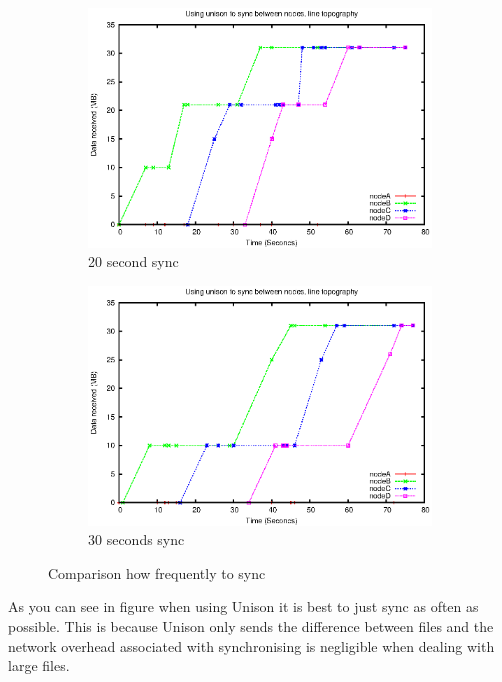 \documentclass[12pt]{article}
\begin{document}
\begin{figure}[htp]
    \begin{subfigure}[b]{0.5\linewidth}
        \centering
        \includegraphics[scale=0.5]{images/line-uni-10-20.eps}
        \caption{20 second sync}
        \label{fig:line_uni_10_20}
    \end{subfigure}
    \begin{subfigure}[b]{0.5\linewidth}
        \centering
        \includegraphics[scale=0.5]{images/line-uni-10-30.eps}
        \caption{30 seconds sync}
        \label{fig:line_uni_10_30}
    \end{subfigure}
    \caption{Comparison how frequently to sync}
\end{figure}

As you can see in figure 
when using Unison it
is best to just sync as often as possible. This is because Unison only sends
the difference between files and the network overhead associated with
synchronising is negligible when dealing with large files.
\end{document}
